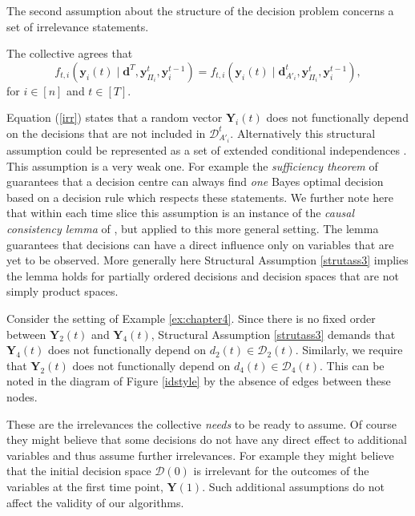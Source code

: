 The second assumption about the structure of the decision problem concerns a set of irrelevance statements. 
\begin{assumption}
The collective agrees that
\begin{equation}
\label{irr}
f_{t,i}\left(\bm{y}_i(t)\;|\;\bm{d}^T, \bm{y}^t_{\Pi_i}, \bm{y}^{t-1}_i\right)=f_{t,i}\left(\bm{y}_i(t)\;|\;\bm{d}^t_{A'_i}, \bm{y}^t_{\Pi_i}, \bm{y}^{t-1}_i\right),
\end{equation}
for $i\in[n]$ and $t\in [T]$.
\label{strutass3}
\end{assumption}
Equation (\ref{irr}) states that a random vector $\bm{Y}_i(t)$ does not functionally depend on the decisions that are not included in $\bm{\mathcal{D}}^t_{A'_i}$. Alternatively this structural assumption could be represented as a set of extended conditional independences \citep{Dawid2014}. This assumption is a very weak  one. For example  the \textit{sufficiency theorem} of \citet{Smith1989, Smith1989a}  guarantees that a decision centre can always find \textit{one} Bayes optimal decision based on a decision rule which respects these statements. We further note here that within each time slice this assumption is an instance of the \textit{causal consistency lemma} of \citet{Cowell1999a}, but applied to this more general setting. The lemma guarantees that decisions can have a direct influence only on variables that are yet to be observed. More generally here Structural Assumption \ref{strutass3} implies the lemma holds for partially ordered decisions and decision spaces that are not simply product spaces.

\begin{example}
Consider the setting of Example \ref{ex:chapter4}. Since there is no fixed order between $\bm{Y}_2(t)$ and $\bm{Y}_4(t)$, Structural Assumption \ref{strutass3} demands that $\bm{Y}_4(t)$  does not functionally depend on $d_2(t)\in\mathcal{D}_2(t)$.  Similarly,  we require that $\bm{Y}_2(t)$ does not functionally depend on $d_4(t)\in\mathcal{D}_4(t)$. This can be noted in the diagram of Figure \ref{idstyle} by the absence of edges between these nodes. 
\end{example}

These are the irrelevances the collective \textit{needs} to be ready to assume. Of course they might believe that some decisions do not have any direct effect to additional variables and thus assume further irrelevances. For example they might believe that the initial decision space $\mathcal{D}(0)$ is irrelevant for the outcomes of the variables at the first time point, $\bm{Y}(1)$. Such additional assumptions do not affect the validity of our algorithms.




